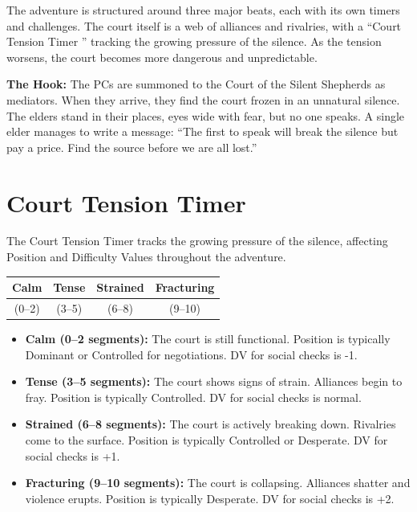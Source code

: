\documentclass{article}
\begin{document}
The adventure is structured around three major beats, each with its own timers and challenges. The court itself is a web of alliances and rivalries, with a ``Court Tension Timer '' tracking the growing pressure of the silence. As the tension worsens, the court becomes more dangerous and unpredictable.

\begin{storybox}
\textbf{The Hook:} The PCs are summoned to the Court of the Silent Shepherds as mediators. When they arrive, they find the court frozen in an unnatural silence. The elders stand in their places, eyes wide with fear, but no one speaks. A single elder manages to write a message: ``The first to speak will break the silence but pay a price. Find the source before we are all lost.''
\end{storybox}

\section{Court Tension Timer }

The Court Tension Timer tracks the growing pressure of the silence, affecting Position and Difficulty Values throughout the adventure.

\begin{center}
\begin{longtable}{|c|c|c|c|}
\hline
\textbf{Calm} & \textbf{Tense} & \textbf{Strained} & \textbf{Fracturing} \\
\hline
(0--2) & (3--5) & (6--8) & (9--10) \\
\hline
\end{longtable}
\end{center}

\begin{itemize}
    \item \textbf{Calm (0--2 segments):} The court is still functional. Position is typically Dominant or Controlled for negotiations. DV for social checks is -1.
    \item \textbf{Tense (3--5 segments):} The court shows signs of strain. Alliances begin to fray. Position is typically Controlled. DV for social checks is normal.
    \item \textbf{Strained (6--8 segments):} The court is actively breaking down. Rivalries come to the surface. Position is typically Controlled or Desperate. DV for social checks is +1.
    \item \textbf{Fracturing (9--10 segments):} The court is collapsing. Alliances shatter and violence erupts. Position is typically Desperate. DV for social checks is +2.
\end{itemize}
\end{document}
